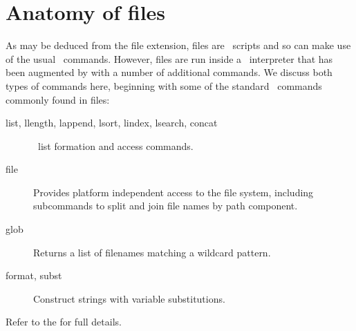 \section{Anatomy of  files}\label{sec:anatomymakerules}
As may be deduced from the file extension,  files are
\Tcl\ scripts and so can make use of the usual \Tcl\ commands. However,
 files are run inside a \Tcl\ interpreter that has
been augmented by  with a number of additional commands. We
discuss both types of commands here, beginning with some of the standard
\Tcl\ commands commonly found in  files:
\begin{description}
\item[list, llength, lappend, lsort, lindex, lsearch, concat]
  \Tcl\ list formation and access commands.
\item[file]
  Provides platform independent access to the file system, including
  subcommands to split and join file names by path component.
\item[glob] Returns a list of filenames matching a wildcard pattern.
\item[format, subst] Construct strings with variable substitutions.
\end{description}
Refer to the
for full details.

